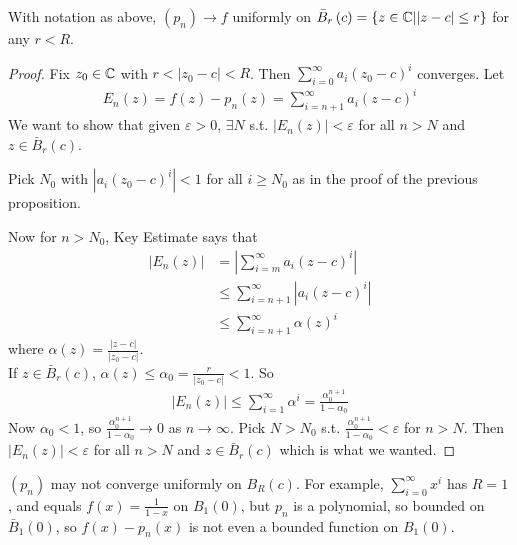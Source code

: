 \documentclass[a4paper]{article}
\begin{document}
\begin{thm}
With notation as above, $\left(p_n\right) \to f$ uniformly on $\bar{B}_r\left(c\right) = \left\{z \in \mathbb{C} | |z-c| \leq r\right\}$ for any $r < R$.
\begin{proof}
Fix $z_0 \in \mathbb{C}$ with $r < |z_0-c| < R$. Then $\sum_{i=0}^\infty a_i\left(z_0-c\right)^i$ converges. Let
\begin{equation*}
\begin{aligned}
E_n\left(z\right) = f\left(z\right) - p_n\left(z\right) = \sum_{i=n+1}^\infty a_i\left(z-c\right)^i
\end{aligned}
\end{equation*}
We want to show that given $\varepsilon>0$, $\exists N$ s.t. $|E_n\left(z\right)|<\varepsilon$ for all $n>N$ and $z \in \bar{B}_r\left(c\right)$.

Pick $N_0$ with $|a_i\left(z_0-c\right)^i | < 1$ for all $i \geq N_0$ as in the proof of the previous proposition.

Now for $n > N_0$, Key Estimate says that
\begin{equation*}
\begin{aligned}
|E_n\left(z\right)| &= \left|\sum_{i=m}^\infty a_i\left(z-c\right)^i \right| \\
&\leq\sum_{i=n+1}^\infty |a_i\left(z-c\right)^i|\\
&\leq\sum_{i=n+1}^\infty \alpha\left(z\right)^i
\end{aligned}
\end{equation*}
where $\alpha\left(z\right) = \frac{|z-c|}{|z_0-c|}$.\\
If $z \in \bar{B}_r\left(c\right)$, $\alpha\left(z\right) \leq \alpha_0 = \frac{r}{|z_0-c|} < 1$. So
\begin{equation*}
\begin{aligned}
\left|E_n\left(z\right) \right| \leq \sum_{i=1}^\infty \alpha^i = \frac{\alpha_0^{n+1}}{1-\alpha_0}
\end{aligned}
\end{equation*}
Now $\alpha_0 < 1$, so $\frac{\alpha_0^{n+1}}{1-\alpha_0} \to 0$ as $n \to \infty$. Pick $N>N_0$ s.t. $\frac{\alpha_0^{n+1}}{1-\alpha_0} < \varepsilon$ for $n>N$. Then $|E_n\left(z\right)| < \varepsilon$ for all $n>N$ and $z \in \bar{B}_r \left(c\right)$ which is what we wanted.
\end{proof}
\end{thm}

\begin{rem}
$\left(p_n\right)$ may not converge uniformly on $B_R\left(c\right)$. For example, $\sum_{i=0}^\infty x^i$ has $R=1$, and equals $f\left(x\right) = \frac{1}{1-x}$ on $B_1\left(0\right)$, but $p_n$ is a polynomial, so bounded on $\bar{B}_1\left(0\right)$, so $f\left(x\right) - p_n\left(x\right)$ is not even a bounded function on $B_1\left(0\right)$.
\end{rem}
\end{document}
